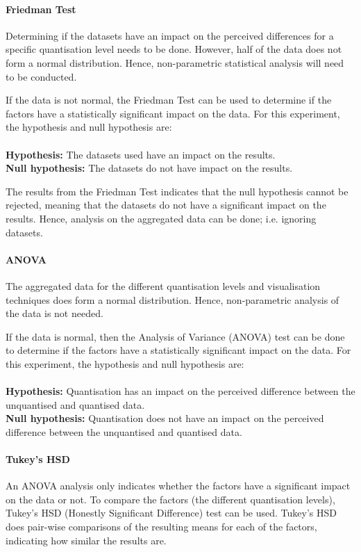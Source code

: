 \paragraph{Friedman Test}
Determining if the datasets have an impact on the perceived differences for a
specific quantisation level needs to be done. However, half of the data does
not form a normal distribution. Hence, non-parametric statistical analysis will
need to be conducted.

If the data is not normal, the Friedman Test can be used to determine if the
factors have a statistically significant impact on the data. For this
experiment, the hypothesis and null hypothesis are: \\ \\
\textbf{Hypothesis:} The datasets used have an impact on the results. \\
\textbf{Null hypothesis:} The datasets do not have impact on the results.

The results from the Friedman Test indicates that the null hypothesis cannot be
rejected, meaning that the datasets do not have a significant impact on the
results. Hence, analysis on the aggregated data can be done; i.e. ignoring
datasets.

\paragraph{ANOVA}
The aggregated data for the different quantisation levels and visualisation
techniques does form a normal distribution. Hence, non-parametric analysis of
the data is not needed.

If the data is normal, then the Analysis of Variance (ANOVA) test can be done
to determine if the factors have a statistically significant impact on the
data.  For this experiment, the hypothesis and null hypothesis are: \\ \\
\textbf{Hypothesis:} Quantisation has an impact on the perceived difference
between the unquantised and quantised data. \\
\textbf{Null hypothesis:} Quantisation does not have an impact on the perceived
difference between the unquantised and quantised data.

\paragraph{Tukey's HSD}
An ANOVA analysis only indicates whether the factors have a significant impact
on the data or not. To compare the factors (the different quantisation levels),
Tukey's HSD (Honestly Significant Difference) test can be used. Tukey's HSD
does pair-wise comparisons of the resulting means for each of the factors,
indicating how similar the results are.

